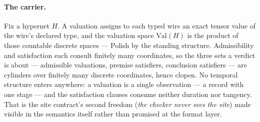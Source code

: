 \paragraph{The carrier.} Fix a hypernet $H$. A valuation assigns to
each typed wire an exact tensor value of the wire's declared type,
and the valuation space $\mathrm{Val}(H)$ is the product of those
countable discrete spaces --- Polish by the standing structure.
Admissibility and satisfaction each consult finitely many
coordinates, so the three sets a verdict is about --- admissible
valuations, premise satisfiers, conclusion satisfiers --- are
cylinders over finitely many discrete coordinates, hence clopen.
No temporal structure enters anywhere: a valuation is a single
observation --- a record with one stage --- and the satisfaction
clauses consume neither duration nor tangency. That is the site
contract's second freedom (\emph{the checker never sees the site})
made visible in the semantics itself rather than promised at the
format layer.

